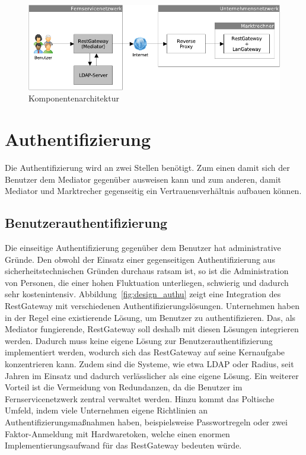 \documentclass[11pt,a4paper]{report}
\begin{document}
\begin{figure}[htbp]
\centering
\includegraphics[scale=0.5]{images/design_architekture.pdf}
\caption{Komponentenarchitektur}
\label{fig:comp_arch}
\end{figure}

\section{Authentifizierung} \label{sec:design_auth}

Die Authentifizierung wird an zwei Stellen benötigt. Zum einen damit sich der Benutzer dem Mediator gegenüber ausweisen kann und zum anderen, damit Mediator und Marktrecher gegenseitig ein Vertrauensverhältnis aufbauen können.

\subsection{Benutzerauthentifizierung} 

Die einseitige Authentifizierung gegenüber dem Benutzer hat administrative Gründe. Den obwohl der Einsatz einer gegenseitigen Authentifizierung aus sicherheitstechnischen Gründen durchaus ratsam ist, so ist die Administration von Personen, die einer hohen Fluktuation unterliegen, schwierig und dadurch sehr kostenintensiv. Abbildung~\ref{fig:design_authu} zeigt eine Integration des RestGateway mit verschiedenen Authentifizierungslösungen. Unternehmen haben in der Regel eine existierende Lösung, um Benutzer zu authentifizieren. Das, als Mediator fungierende, RestGateway soll deshalb mit diesen Lösungen integrieren werden. Dadurch muss keine eigene Lösung zur Benutzerauthentifizierung implementiert werden, wodurch sich das RestGateway auf seine Kernaufgabe konzentrieren kann. Zudem sind die Systeme, wie etwa LDAP oder Radius, seit Jahren im Einsatz und dadurch verlässlicher als eine eigene Lösung. Ein weiterer Vorteil ist die Vermeidung von Redundanzen, da die Benutzer im Fernservicenetzwerk zentral verwaltet werden. Hinzu kommt das Poltische Umfeld, indem viele Unternehmen eigene Richtlinien an Authentifizierungsmaßnahmen haben, beispielsweise Passwortregeln oder zwei Faktor-Anmeldung mit Hardwaretoken, welche einen enormen Implementierungsaufwand für das RestGateway bedeuten würde.
\end{document}
